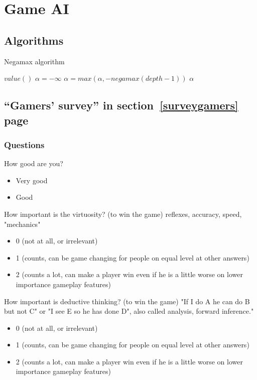 \chapter{Game AI}
\label{apdx:gameAI}

\section{Algorithms}

\begin{algorithm}
\caption{Negamax algorithm}
\label{alg:negamax}
\begin{algorithmic}
        \State \Return $value()$
    \EndIf
    \State $\alpha = -\infty$
        \State $\alpha = max(\alpha, -negamax(depth-1))$
    \EndFor
    \State \Return $\alpha$
\EndFunction
\end{algorithmic}
\end{algorithm}

\section{``Gamers' survey'' in section~\ref{surveygamers} page~\pageref{surveygamers}}

\label{apdx:survey}
\subsection{Questions}

How good are you?
\begin{itemize}
    \item Very good
    \item Good
\end{itemize}


How important is the virtuosity? (to win the game)
reflexes, accuracy, speed, "mechanics"
\begin{itemize}
    \item 0 (not at all, or irrelevant)
    \item 1 (counts, can be game changing for people on equal level at other answers)
    \item 2 (counts a lot, can make a player win even if he is a little worse on lower importance gameplay features)
\end{itemize}


How important is deductive thinking? (to win the game)
"If I do A he can do B but not C" or "I see E so he has done D", also called analysis, forward inference."
\begin{itemize}
    \item 0 (not at all, or irrelevant)
    \item 1 (counts, can be game changing for people on equal level at other answers)
    \item 2 (counts a lot, can make a player win even if he is a little worse on lower importance gameplay features)
\end{itemize}


